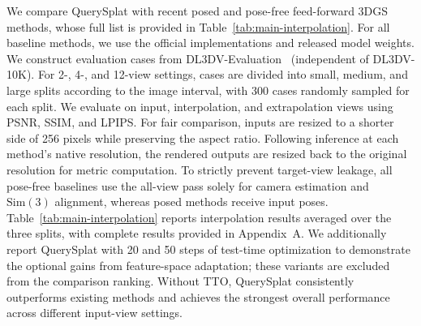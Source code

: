 \documentclass[letterpaper]{article} %
\begin{document}
We compare QuerySplat with recent posed and pose-free feed-forward 3DGS methods, whose full list is provided in Table~\ref{tab:main-interpolation}.
For all baseline methods, we use the official implementations and released model weights. We construct evaluation cases from DL3DV-Evaluation~\cite{ling2024dl3dv} (independent of DL3DV-10K). For 2-, 4-, and 12-view settings, cases are divided into small, medium, and large splits according to the image interval, with 300 cases randomly sampled for each split. We evaluate on input, interpolation, and extrapolation views using PSNR, SSIM, and LPIPS. 
For fair comparison, inputs are resized to a shorter side of 256 pixels while preserving the aspect ratio. Following inference at each method's native resolution, the rendered outputs are resized back to the original resolution for metric computation. To strictly prevent target-view leakage, all pose-free baselines use the all-view pass solely for camera estimation and $\mathrm{Sim}(3)$ alignment, whereas posed methods receive input poses.
Table~\ref{tab:main-interpolation} reports interpolation results averaged over the three splits, with complete results provided in Appendix~A. We additionally report QuerySplat with 20 and 50 steps of test-time optimization to demonstrate the optional gains from feature-space adaptation; these variants are excluded from the comparison ranking. Without TTO, QuerySplat consistently outperforms existing methods and achieves the strongest overall performance across different input-view settings.
\end{document}
